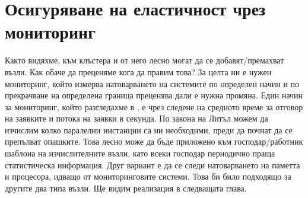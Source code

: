 \section{Осигуряване на еластичност чрез мониторинг}

Както видяхме, към клъстера и от него лесно могат да се добавят/премахват възли. Как обаче да преценяме кога да правим това? За целта ни е нужен мониторинг, който измерва натоварването на системите по определен начин и по прекрачване на определена граница преценява дали е нужна промяна. Един начин за мониторинг, който разгледахме в , е чрез следене на средното време за отговор на заявките и потока на заявки в секунда. По закона на Литъл можем да изчислим колко паралелни инстанции са ни необходими, преди да почнат да се препълват опашките. Това лесно може да бъде приложено към господар/работник шаблона на изчислителните възли, като всеки господар периодично праща статистическа информация. Друг вариант е да се следи натоварването на паметта и процесора, идващо от мониторинговите системи. Това би било подходящо за другите два типа възли. Ще видим реализация в следващата глава.

